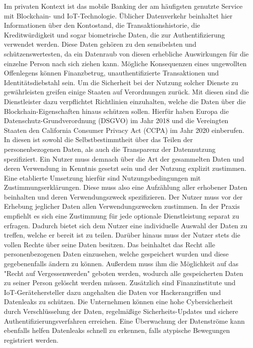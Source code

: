 Im privaten Kontext ist das mobile Banking der am häufigsten genutzte Service mit 
Blockchain- und IoT-Technologie.
Üblicher Datenverkehr beinhaltet hier Informationen über den Kontostand, die Transaktionshistorie, die
Kreditwürdigkeit und sogar biometrische Daten, die zur Authentifizierung verwendet werden.
Diese Daten gehören zu den sensibelsten und schützenswertesten, da ein Datenraub von diesen erhebliche 
Auswirkungen für die einzelne Person nach sich ziehen kann.
Mögliche Konsequenzen eines ungewollten Offenlegens können Finanzbetrug, unauthentifizierte Transaktionen 
und Identitätsdiebstahl sein. 
Um die Sicherheit bei der Nutzung solcher Dienste zu gewährleisten greifen einige Staaten auf Verordnungen
zurück. Mit diesen sind die Dienstleister dazu verpflichtet Richtlinien einzuhalten, welche die Daten über
die Blockchain-Eigenschaften hinaus schützen sollen.
Hierfür haben Europa die Datenschutz-Grundverordnung (DSGVO) im Jahr 2018 und die Vereingten Staaten
den California Consumer Privacy Act (CCPA) im Jahr 2020 einberufen.
In diesen ist sowohl die Selbstbestimmtheit über das Teilen der personenbezogenen Daten, als auch die 
Transparenz der Datennutzung spezifiziert.
Ein Nutzer muss demnach über die Art der gesammelten Daten und deren Verwendung in
Kenntnis gesetzt sein und der Nutzung explizit zustimmen.
Eine etablierte Umsetzung hierfür sind Nutzungsbedingungen mit Zustimmungserklärungen.
Diese muss also eine Aufzählung aller erhobener Daten beinhalten und deren Verwendungszweck spezifizieren.
Der Nutzer muss vor der Erhebung jeglicher Daten allen Verwendungszwecken zustimmen.
In der Praxis empfiehlt es sich eine Zustimmung für jede optionale Dienstleistung separat zu erfragen.
Dadurch bietet sich dem Nutzer eine individuelle Auswahl der Daten zu treffen, welche er bereit ist zu teilen.
Darüber hinaus muss der Nutzer stets die vollen Rechte über seine Daten besitzen.
Das beinhaltet das Recht alle personenbezogenen Daten einzusehen, welche gespeichert wurden und diese gegebenenfalls
ändern zu können. Au\ss erdem muss ihm die Möglichkeit auf das "Recht auf Vergessenwerden" geboten werden, 
wodurch alle gespeicherten Daten zu seiner Person gelöscht werden müssen.
Zusätzlich sind Finanzinstitute und IoT-Gerätehersteller dazu angehalten die Daten vor Hackerangriffen und 
Datenleaks zu schützen.
Die Unternehmen können eine hohe Cybersicherheit durch Verschlüsselung der Daten, regelmä\ss ige 
Sicherheits-Updates und sichere Authentifizierungsverfahren erreichen.
Eine Überwachung der Datenströme kann ebenfalls helfen Datenleaks schnell zu erkennen, falls atypische 
Bewegungen registriert werden.
\cite[p.~172]{chowdhary2025smart}

